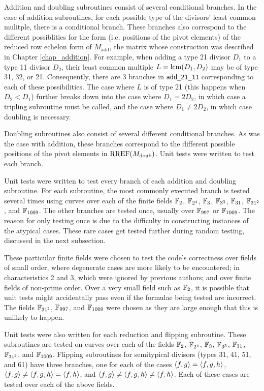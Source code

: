 Addition and doubling subroutines consist of several conditional branches.
In the case of addition subroutines,
for each possible type of the divisors' least common mulitple,
there is a conditional branch.
These branches also correspond to the different possiblities for
the form (i.e. positions of the pivot elements)
of the reduced row echelon form of $M_{\text{add}}$,
the matrix whose construction was described in Chapter \ref{chap_addition}.
For example, when adding a type 21 divisor $D_1$ to a type 11 divisor $D_2$,
their least common multiple $L = \operatorname{lcm}(D_1, D_2)$ may be of type 31, 32, or 21.
Consequently, there are 3 branches in {\tt add\_21\_11} corresponding to each of these possibilities.
The case where $L$ is of type 21 (this happens when $D_2 < D_1$)
further breaks down into the case where $D_1 = 2D_2$,
in which case a tripling subroutine must be called,
and the case where $D_1 \neq 2D_2$, in which case doubling is necessary.

Doubling subroutines also consist of several different conditional branches.
As was the case with addition,
these branches correspond to the different possible positions
of the pivot elements in $\operatorname{RREF}(M_{\text{doub}})$.
Unit tests were written to test each branch.

Unit tests were written to test every branch of each addition and doubling subroutine.
For each subroutine, the most commonly executed branch is tested several times
using curves over each of the finite fields $\mathbb{F}_{2}$, $\mathbb{F}_{2^4}$,
$\mathbb{F}_{3}$, $\mathbb{F}_{3^3}$, $\mathbb{F}_{31}$, $\mathbb{F}_{31^2}$, and $\mathbb{F}_{1009}$.
The other branches are tested once, usually over $\mathbb{F}_{997}$ or $\mathbb{F}_{1009}$.
The reason for only testing once is due to the difficulty in constructing instances of the atypical cases.
These rare cases get tested further during random testing, discussed in the next subsection.

These particular finite fields were chosen to test the code's correctness
over fields of small order, where degenerate cases are more likely to be encountered;
in characteristics 2 and 3, which were ignored by previous authors;
and over finite fields of non-prime order.
Over a very small field such as $\mathbb{F}_2$, it is possible that unit tests might accidentally pass
even if the formulae being tested are incorrect.
The fields $\mathbb{F}_{31^2}$, $\mathbb{F}_{997}$, and $\mathbb{F}_{1009}$ were chosen
as they are large enough that this is unlikely to happen.

Unit tests were also written for each reduction and flipping subroutine.
These subroutines are tested on curves over each of the fields
$\mathbb{F}_{2}$, $\mathbb{F}_{2^4}$, $\mathbb{F}_{3}$, $\mathbb{F}_{3^3}$, $\mathbb{F}_{31}$, $\mathbb{F}_{31^2}$, and $\mathbb{F}_{1009}$.
Flipping subroutines for semitypical divisors (types 31, 41, 51, and 61) have three branches,
one for each of the cases $\left\langle f,g \right\rangle = \left\langle f,g,h \right\rangle$, $\left\langle f,g \right\rangle \neq \left\langle f,g,h \right\rangle = \left\langle f,h \right\rangle$,
and $\left\langle f,g \right\rangle \neq \left\langle f,g,h \right\rangle \neq \left\langle f,h \right\rangle$.
Each of these cases are tested over each of the above fields.



